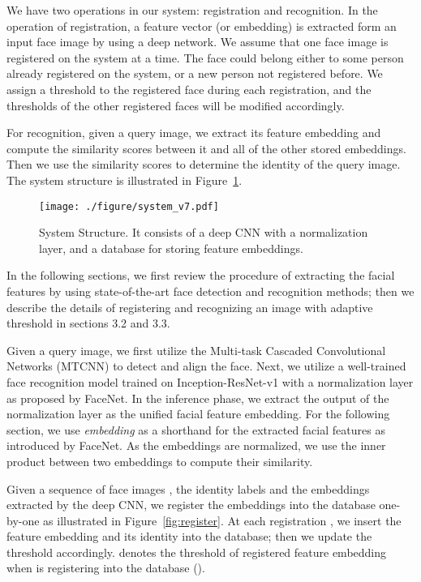 \documentclass[10pt,twocolumn]{article}
\begin{document}
We have two operations in our system: registration and recognition. In the operation of registration, a feature vector (or embedding) is extracted form an input face image by using a deep network. We assume that one face image is registered on the system at a time. The face could belong either to some person already registered on the system, or a new person not registered before. 
We assign a threshold to the registered face during each registration, and the thresholds of the other registered faces will be modified accordingly.

For recognition, given a query image, we extract its feature embedding and compute the similarity scores between it and all of the other stored embeddings. Then we use the similarity scores to determine the identity of the query image.
The system structure is illustrated in Figure~\ref{fig:structure}.
\begin{figure}[t]
\centering
\texttt{[image: ./figure/system\_v7.pdf]}
\caption{System Structure. It consists of a deep CNN with a  normalization layer, and a database for storing feature embeddings.}
\label{fig:structure}
\end{figure}

In the following sections, we first review the procedure of extracting the facial features by using state-of-the-art face detection and recognition methods; then we describe the details of registering and recognizing an image with adaptive threshold in sections 3.2 and 3.3.





Given a query image, we first utilize the Multi-task Cascaded Convolutional Networks (MTCNN)\cite{zhang2016joint} to detect and align the face.
Next, we utilize a well-trained face recognition model trained on Inception-ResNet-v1\cite{szegedy2017inception} with a  normalization layer as proposed by FaceNet\cite{schroff2015facenet}. In the inference phase, we extract the output of the  normalization layer as the unified facial feature embedding.
For the following section, we use \textit{embedding} as a shorthand for the extracted facial features as introduced by FaceNet.
As the embeddings are normalized, we use the inner product between two embeddings to compute their similarity.

Given a sequence of face images , the identity labels  and the embeddings  extracted by the deep CNN, we register the embeddings into the database one-by-one as illustrated in Figure~\ref{fig:register}. At each registration , we insert the feature embedding  and its identity  into the database; then we update the threshold  accordingly.  denotes the threshold of registered feature embedding  when  is registering into the database ().
\end{document}
